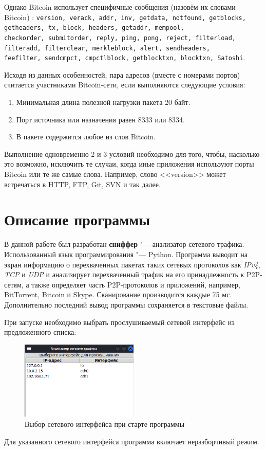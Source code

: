 \documentclass[bachelor, och, coursework]{SCWorks}
\begin{document}
Однако Bitcoin использует специфичные сообщения (назовём их словами Bitcoin) \cite{bitcoin_sp}: 
\texttt{version, verack, addr, inv, getdata, notfound, getblocks, getheaders, tx,  
block, headers, getaddr, mempool, \\ checkorder, submitorder, reply, ping, pong, reject, 
filterload, \\ filteradd, filterclear, merkleblock, alert, sendheaders, \\ feefilter,
sendcmpct, cmpctlblock, getblocktxn, blocktxn, Satoshi}.

Исходя из данных особенностей, пара адресов (вместе с номерами портов) считается участниками Bitcoin-сети, если выполняются следующие условия:
\begin{enumerate}
    \item Минимальная длина полезной нагрузки пакета 20 байт.
    \item Порт источника или назначения равен 8333 или 8334.
    \item В пакете содержится любое из слов Bitcoin.
\end{enumerate}

Выполнение одновременно 2 и 3 условий необходимо для того, чтобы, насколько это возможно, исключить те случаи, когда иные приложения используют порты Bitcoin или те же самые слова. Например, слово <<version>> может встречаться в HTTP, FTP, Git, SVN и так далее.

\section{Описание программы}
В данной работе был разработан \textbf{сниффер} "--- анализатор сетевого трафика. Использованный язык программирования "--- Python.
Программа выводит на экран информацию о перехваченных пакетах таких сетевых протоколов как \textit{IPv4}, \textit{TCP} и \textit{UDP} и анализирует перехваченный трафик на его принадлежность к P2P-сетям, а также определяет часть P2P-протоколов и приложений, например, BitTorrent, Bitcoin и Skype. Сканирование производится каждые 75 мс.
Дополнительно последний вывод программы сохраняется в текстовые файлы.

При запуске необходимо выбрать прослушиваемый сетевой интерфейс из предложенного списка:
\begin{figure}[H]
    \centering
    \includegraphics[width=0.5\textwidth]{ifaces.png}
    \caption{Выбор сетевого интерфейса при старте программы}
\end{figure}
Для указанного сетевого интерфейса программа включает неразборчивый режим.
\end{document}
